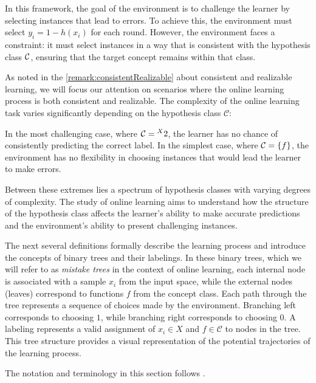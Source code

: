 In this framework, the goal of the environment is to challenge the learner by selecting instances that lead to errors. To achieve this, the environment must select $y_i = 1 - h(x_i)$ for each round. However, the environment faces a constraint: it must select instances in a way that is consistent with the hypothesis class $\mathcal{C}$, ensuring that the target concept remains within that class.

As noted in the \cref{remark:consistentRealizable} about consistent and realizable learning, we will focus our attention on scenarios where the online learning process is both consistent and realizable. The complexity of the online learning task varies significantly depending on the hypothesis class $\mathcal{C}$:

\begin{outline}
    \1 In the most challenging case, where $\mathcal{C} = \prescript{X}{}{2}$, the learner has no chance of consistently predicting the correct label.
    \1 In the simplest case, where $\mathcal{C} = \{f\}$, the environment has no flexibility in choosing instances that would lead the learner to make errors.
\end{outline}

Between these extremes lies a spectrum of hypothesis classes with varying degrees of complexity. The study of online learning aims to understand how the structure of the hypothesis class affects the learner's ability to make accurate predictions and the environment's ability to present challenging instances.

The next several definitions formally describe the learning process and introduce the concepts of binary trees and their labelings. In these binary trees, which we will refer to as \emph{mistake trees} in the context of online learning, each internal node is associated with a sample $x_i$ from the input space, while the external nodes (leaves) correspond to functions $f$ from the concept class.
Each path through the tree represents a sequence of choices made by the environment. Branching left corresponds to choosing $1$, while branching right corresponds to choosing $0$. A labeling represents a valid assignment of $x_i \in X$ and $f \in \mathcal{C}$ to nodes in the tree. This tree structure provides a visual representation of the potential trajectories of the learning process. 

The notation and terminology in this section follows \cite{Bhaskar2021}.

